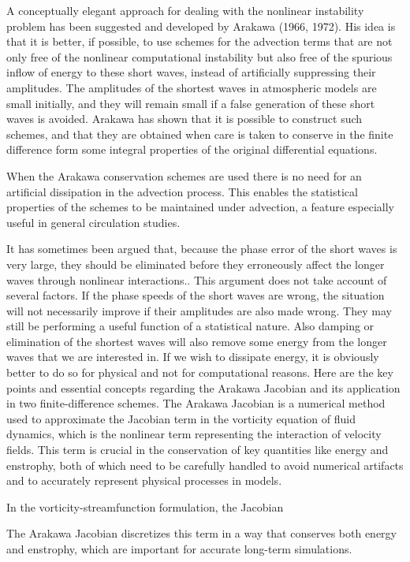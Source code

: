 A conceptually elegant approach for dealing with the nonlinear instability problem has been suggested and developed by Arakawa (1966, 1972). His idea is that it is better, if possible, to use schemes for the advection terms that are not only free of the nonlinear computa­tional instability but also free of the spurious inflow of energy to these short waves, instead of artificially suppress­ing their amplitudes. The amplitudes of the shortest waves in atmospheric models are small initially, and they will remain small if a false generation of these short waves is avoided. Arakawa has shown that it is possible to construct such schemes, and that they are obtained when care is taken to conserve in the finite difference form some integral properties of the original differential equa­tions.

When the Arakawa conservation schemes are used there is no need for an artificial dissipation in the advec­tion process. This enables the statistical properties of the schemes to be maintained under advection, a feature especially useful in general circulation studies.

It has sometimes been argued that, because the phase error of the short waves is very large, they should be eliminated before they erroneously affect the longer waves through nonlinear interactions.. This argument does not take account of several factors. If the phase speeds of the short waves are wrong, the situation will not necessar­ily improve if their amplitudes are also made wrong. They may still be performing a useful function of a statistical nature. Also damping or elimination of the shortest waves will also remove some energy from the longer waves that we are interested in. If we wish to dissipate energy, it is obviously better to do so for physical and not for computational reasons.
Here are the key points and essential concepts regarding the Arakawa Jacobian and its application in two finite-difference schemes. The Arakawa Jacobian is a numerical method used to approximate the Jacobian term in the vorticity equation of fluid dynamics, which is the nonlinear term representing the interaction of velocity fields. This term is crucial in the conservation of key quantities like energy and enstrophy, both of which need to be carefully handled to avoid numerical artifacts and to accurately represent physical processes in models.

In the vorticity-streamfunction formulation, the Jacobian 

The Arakawa Jacobian discretizes this term in a way that conserves both energy and enstrophy, which are important for accurate long-term simulations.

